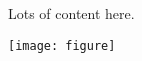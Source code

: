 \documentclass[12pt]{article}
\begin{document}
Lots of content here.


\texttt{[image: figure]}  
\end{document}
